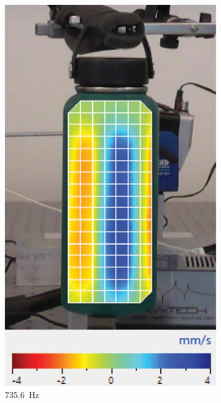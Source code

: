 \documentclass[twoside,a4paper]{article}
\begin{document}
\begin{figure}[!t]
\begin{subfigure}[b]{.32\columnwidth}
         \includegraphics[width=\columnwidth]{Paper/Figures/Water_735_6.jpg}
         \caption{735.6\ Hz}
    \end{subfigure}
    \begin{subfigure}[b]{.32\columnwidth}
         \centering

\end{subfigure}
\end{figure}
\end{document}
